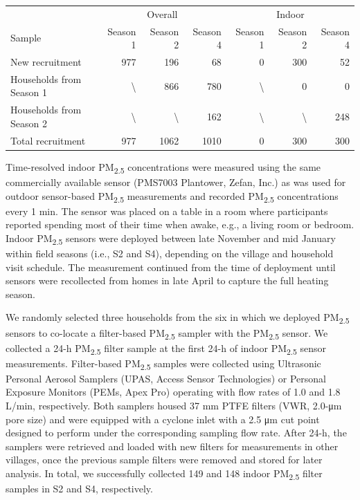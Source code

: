 \documentclass[
  letterpaper,
  DIV=11,
  numbers=noendperiod]{scrartcl}
\makeatletter
\renewenvironment{table}%
  {\renewcommand\familydefault\sfdefault
   \@float{table}}
  {\end@float}
\makeatother
\begin{document}
\hypertarget{tbl-pm-sample}{}
\begin{table}
\caption{\label{tbl-pm-sample}Household recruitment for overall and indoor air quality measurements. }\tabularnewline

\centering
\begin{tabular}{lrrrrrr}
\toprule
\multicolumn{1}{c}{ } & \multicolumn{3}{c}{Overall} & \multicolumn{3}{c}{Indoor} \\
\cmidrule(l{3pt}r{3pt}){2-4} \cmidrule(l{3pt}r{3pt}){5-7}
Sample & Season 1 & Season 2 & Season 4 & Season 1 & Season 2 & Season 4\\
\midrule
New recruitment & 977 & 196 & 68 & 0 & 300 & 52\\
Households from Season 1 & \textbackslash{} & 866 & 780 & \textbackslash{} & 0 & 0\\
Households from Season 2 & \textbackslash{} & \textbackslash{} & 162 & \textbackslash{} & \textbackslash{} & 248\\
Total recruitment & 977 & 1062 & 1010 & 0 & 300 & 300\\
\bottomrule
\end{tabular}
\end{table}

Time-resolved indoor PM\textsubscript{2.5} concentrations were measured
using the same commercially available sensor (PMS7003 Plantower, Zefan,
Inc.) as was used for outdoor sensor-based PM\textsubscript{2.5}
measurements and recorded PM\textsubscript{2.5} concentrations every 1
min. The sensor was placed on a table in a room where participants
reported spending most of their time when awake, e.g., a living room or
bedroom. Indoor PM\textsubscript{2.5} sensors were deployed between late
November and mid January within field seasons (i.e., S2 and S4),
depending on the village and household visit schedule. The measurement
continued from the time of deployment until sensors were recollected
from homes in late April to capture the full heating season.

We randomly selected three households from the six in which we deployed
PM\textsubscript{2.5} sensors to co-locate a filter-based
PM\textsubscript{2.5} sampler with the PM\textsubscript{2.5} sensor. We
collected a 24-h PM\textsubscript{2.5} filter sample at the first 24-h
of indoor PM\textsubscript{2.5} sensor measurements. Filter-based
PM\textsubscript{2.5} samples were collected using Ultrasonic Personal
Aerosol Samplers (UPAS, Access Sensor Technologies) or Personal Exposure
Monitors (PEMs, Apex Pro) operating with flow rates of 1.0 and 1.8
L/min, respectively. Both samplers housed 37 mm PTFE filters (VWR,
2.0-μm pore size) and were equipped with a cyclone inlet with a 2.5 μm
cut point designed to perform under the corresponding sampling flow
rate. After 24-h, the samplers were retrieved and loaded with new
filters for measurements in other villages, once the previous sample
filters were removed and stored for later analysis. In total, we
successfully collected 149 and 148 indoor PM\textsubscript{2.5} filter
samples in S2 and S4, respectively.
\end{document}
